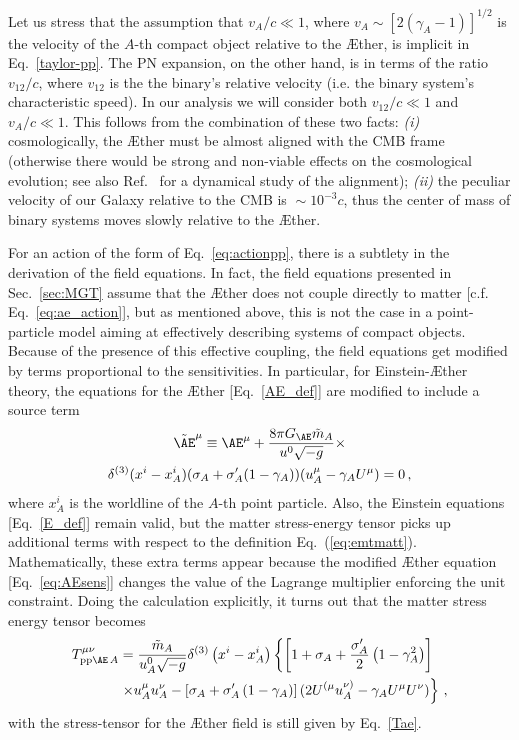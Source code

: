 \documentclass[prd,aps,twocolumn,nofootinbib,showpacs,superscriptaddress]{revtex4-1}
\def\m{\mu}
\def\n{\nu}
\newcommand{\nn}{\nonumber}
\begin{document}
Let us stress that the assumption that $v_A/c\ll 1$,  where $v_{A}\sim [2(\gamma_{A}-1)]^{1/2}$ is the velocity of the $A$-th compact object
relative to the \AE ther, is implicit in Eq.~\eqref{taylor-pp}.
The PN expansion, on the other hand, is in terms of the ratio $v_{12}/c$, 
where $v_{12}$ is the
the binary's relative velocity
(i.e. the binary system's characteristic speed).
In our analysis we will consider both $v_{12}/c\ll 1$ and $v_A/c\ll1$. 
This follows from the combination of these two facts: \textit{(i)} cosmologically, the \AE ther must be almost aligned
with the CMB frame (otherwise there would be strong and non-viable effects on the cosmological evolution; see also Ref.~\cite{Carruthers:2010ii} for a dynamical study of the alignment);
\textit{(ii)} the peculiar velocity of our Galaxy relative to the CMB is ${}\sim 10^{-3} c$, thus
the center of mass of binary systems moves slowly relative to the \AE ther. 

For an action of the form of Eq.~\eqref{eq:actionpp}, there is a subtlety in 
the derivation of the field equations.
In fact, the field equations presented in Sec.~\ref{sec:MGT} assume that the \AE ther does not couple directly to matter
[c.f. Eq.~\eqref{eq:ae_action}], but as mentioned above, this is not the case in a point-particle model aiming at
 effectively describing systems of compact objects.
Because of the presence of this effective coupling, the field equations get modified by terms
proportional to the sensitivities. In particular, for Einstein-\AE ther theory, 
the equations for the \AE ther [Eq.~\eqref{AE_def}]
are modified to include a source term
\begin{multline}
\label{eq:AEsens}
\tilde{\AE}^\mu\equiv \AE^\mu+\frac{8\pi G_{\AE}\tilde m_A}{u^0 \sqrt{-g}}\times\\\delta^{(3)}(x^i-x^i_A)(\sigma_A+\sigma_A'(1-\gamma_A))
 (u_{A}^\m-\gamma_AU^\m )=0\,,
\end{multline}
where $x_{A}^{i}$ is the worldline of the $A$-th point particle.
Also, the Einstein
equations [Eq.~\eqref{E_def}] remain valid, but the matter stress-energy tensor picks up additional terms with respect
to the definition Eq.~(\ref{eq:emtmatt}). Mathematically, these extra terms appear because the modified \AE ther equation [Eq.~\eqref{eq:AEsens}]
changes the value of the Lagrange multiplier
enforcing the unit constraint. Doing the calculation explicitly, it turns out that the matter
stress energy tensor becomes
%
\begin{align}
T^{\mu \nu}_{{\rm pp}{\AE}\,A} &= \frac{\tilde{m}_{A}}{u_{A}^{0} \sqrt{-g}} \delta^{(3)}\left(x^{i} - x^{i}_{A}\right) 
\left\{ \left[ 1 + \sigma_{A} + \frac{\sigma_{A}'}{2} \left(1 - \gamma^2_{A}\right) \right] 
\right.
\nn \\
&\left.
\times u^{\mu}_{A} u^{\nu}_{A} -  \left[\sigma_{A} + \sigma_{A}' \left(1 - \gamma_{A}\right) \right]( 2U^{(\mu} u_{A}^{\nu)}
-\gamma_AU^\m
U^\n) \right\}\,,\label{Tpp}
\end{align}
%
with the stress-tensor for the \AE ther field is still given by Eq.~\eqref{Tae}. 
\end{document}
